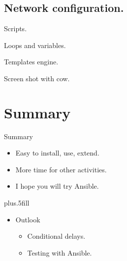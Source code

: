\documentclass{beamer}
\begin{document}
\subsection {Network configuration.}

\begin{frame}{Scripts.}
  
\end{frame}

\begin{frame}{Loops and variables.}
  
  
\end{frame}

\begin{frame}{Templates engine.}
  
  
  
\end{frame}

\begin{frame}{Screen shot with cow.}
\end{frame}



\section*{Summary}

\begin{frame}{Summary}

  \begin{itemize}
  \item
    Easy to install, use, extend.
  \item
    More time for other activities.
  \item
    I hope you will try Ansible.
  \end{itemize}
  
  \vskip0pt plus.5fill
  \begin{itemize}
  \item
    Outlook
    \begin{itemize}
    \item
      Conditional delays.
    \item
      Testing with Ansible.
    \end{itemize}
  \end{itemize}
\end{frame}
\end{document}
